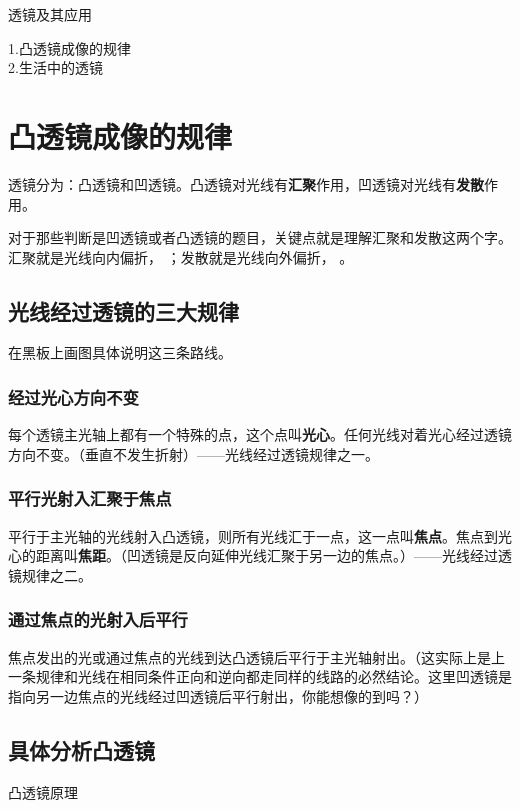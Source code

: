 \documentclass[12pt]{exam}
\newcommand{\keti}{透镜及其应用}
\newcommand{\zhongdian}{1.凸透镜成像的规律 \\2.生活中的透镜 }
\begin{document}
\vspace*{80pt}
\keti \par
\zhongdian \par
\section{凸透镜成像的规律}
透镜分为：凸透镜和凹透镜。凸透镜对光线有\textbf{汇聚}作用，凹透镜对光线有\textbf{发散}作用。

对于那些判断是凹透镜或者凸透镜的题目，关键点就是理解汇聚和发散这两个字。汇聚就是光线向内偏折， ；发散就是光线向外偏折， 。 

\subsection{光线经过透镜的三大规律}
在黑板上画图具体说明这三条路线。
\subsubsection{经过光心方向不变}
每个透镜主光轴上都有一个特殊的点，这个点叫\textbf{光心}。任何光线对着光心经过透镜方向不变。（垂直不发生折射）——光线经过透镜规律之一。

\subsubsection{平行光射入汇聚于焦点}
平行于主光轴的光线射入凸透镜，则所有光线汇于一点，这一点叫\textbf{焦点}。焦点到光心的距离叫\textbf{焦距}。（凹透镜是反向延伸光线汇聚于另一边的焦点。）——光线经过透镜规律之二。

\subsubsection{通过焦点的光射入后平行}
焦点发出的光或通过焦点的光线到达凸透镜后平行于主光轴射出。（这实际上是上一条规律和光线在相同条件正向和逆向都走同样的线路的必然结论。这里凹透镜是指向另一边焦点的光线经过凹透镜后平行射出，你能想像的到吗？）


\subsection{具体分析凸透镜}
\begin{fig}{凸透镜原理}
\end{fig}
\end{document}
